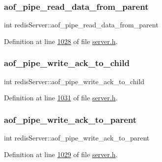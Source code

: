 \subsubsection{\texorpdfstring{aof\+\_\+pipe\+\_\+read\+\_\+data\+\_\+from\+\_\+parent}{aof\_pipe\_read\_data\_from\_parent}}
{\footnotesize\ttfamily int redis\+Server\+::aof\+\_\+pipe\+\_\+read\+\_\+data\+\_\+from\+\_\+parent}



Definition at line \hyperlink{server_8h_source_l01028}{1028} of file \hyperlink{server_8h_source}{server.\+h}.

\mbox{\label{structredisServer_ac3fd4c78efc5064c78a02c376c95d3a6}} 
\subsubsection{\texorpdfstring{aof\+\_\+pipe\+\_\+write\+\_\+ack\+\_\+to\+\_\+child}{aof\_pipe\_write\_ack\_to\_child}}
{\footnotesize\ttfamily int redis\+Server\+::aof\+\_\+pipe\+\_\+write\+\_\+ack\+\_\+to\+\_\+child}



Definition at line \hyperlink{server_8h_source_l01031}{1031} of file \hyperlink{server_8h_source}{server.\+h}.

\mbox{\label{structredisServer_a6c0d0955ed07e06f37f2e6f922f0ebb8}} 
\subsubsection{\texorpdfstring{aof\+\_\+pipe\+\_\+write\+\_\+ack\+\_\+to\+\_\+parent}{aof\_pipe\_write\_ack\_to\_parent}}
{\footnotesize\ttfamily int redis\+Server\+::aof\+\_\+pipe\+\_\+write\+\_\+ack\+\_\+to\+\_\+parent}



Definition at line \hyperlink{server_8h_source_l01029}{1029} of file \hyperlink{server_8h_source}{server.\+h}.

